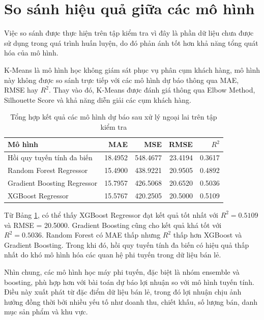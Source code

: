 \section{So sánh hiệu quả giữa các mô hình}

 Việc so sánh được thực hiện trên tập kiểm tra vì đây là phần dữ liệu chưa được sử dụng trong quá trình huấn luyện, do đó phản ánh tốt hơn khả năng tổng quát hóa của mô hình.

K-Means là mô hình học không giám sát phục vụ phân cụm khách hàng, mô hình này không được so sánh trực tiếp với các mô hình dự báo thông qua MAE, RMSE hay \(R^2\). Thay vào đó, K-Means được đánh giá thông qua Elbow Method, Silhouette Score và khả năng diễn giải các cụm khách hàng.

\begin{table}[H]
	\centering
	\caption{Tổng hợp kết quả các mô hình dự báo sau xử lý ngoại lai trên tập kiểm tra}
	\label{tab:model_result_after_outlier}
	\begin{tabular}{|l|r|r|r|r|}
		\hline
		\textbf{Mô hình} & \textbf{MAE} & \textbf{MSE} & \textbf{RMSE} & \textbf{\(R^2\)} \\ \hline
		Hồi quy tuyến tính đa biến & 18.4952 & 548.4677 & 23.4194 & 0.3617 \\ \hline
		Random Forest Regressor & 15.4900 & 438.9221 & 20.9505 & 0.4892 \\ \hline
		Gradient Boosting Regressor & 15.7957 & 426.5068 & 20.6520 & 0.5036 \\ \hline
		XGBoost Regressor & 15.5767 & 420.2505 & 20.5000 & 0.5109 \\ \hline
	\end{tabular}
\end{table}

Từ Bảng \ref{tab:model_result_after_outlier}, có thể thấy XGBoost Regressor đạt kết quả tốt nhất với \(R^2 = 0.5109\) và RMSE = 20.5000. Gradient Boosting cũng cho kết quả khá tốt với \(R^2 = 0.5036\). Random Forest có MAE thấp nhưng \(R^2\) thấp hơn XGBoost và Gradient Boosting. Trong khi đó, hồi quy tuyến tính đa biến có hiệu quả thấp nhất do khó mô hình hóa các quan hệ phi tuyến trong dữ liệu bán lẻ.

Nhìn chung, các mô hình học máy phi tuyến, đặc biệt là nhóm ensemble và boosting, phù hợp hơn với bài toán dự báo lợi nhuận so với mô hình tuyến tính. Điều này xuất phát từ đặc điểm dữ liệu bán lẻ, trong đó lợi nhuận chịu ảnh hưởng đồng thời bởi nhiều yếu tố như doanh thu, chiết khấu, số lượng bán, danh mục sản phẩm và khu vực.


